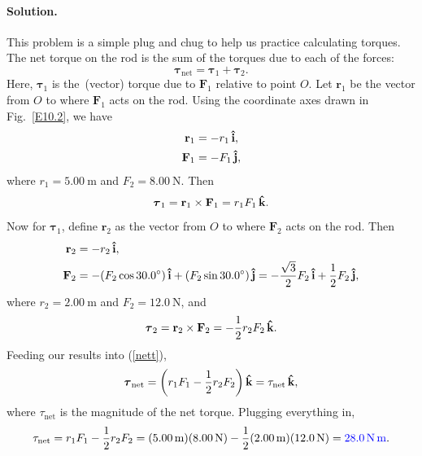 \documentclass[11pt]{article}
\newcommand{\refeq}[1]{(\ref{#1})}
\newcommand{\beq}{\begin{equation*}}
\newcommand{\eeq}{\end{equation*}}
\newcommand{\beqn}{\begin{equation}}
\newcommand{\eeqn}{\end{equation}}
\newenvironment{solution}
{
    \paragraph{Solution.}
    \ignorespaces
}
{
    \bigskip
}
\renewcommand{\vec}[1]{\mathbf{#1}}
\begin{document}
\newcommand{\vF}{\vec{F}}
\newcommand{\vt}{\boldsymbol{\tau}}
\newcommand{\vr}{\vec{r}}

\newcommand{\vFq}{\vF_1}
\newcommand{\Fq}{F_1}
\newcommand{\vFw}{\vF_2}
\newcommand{\Fw}{F_2}

\newcommand{\vtq}{\vt_1}
\newcommand{\vtw}{\vt_2}
\newcommand{\vrq}{\vr_1}
\newcommand{\rrq}{r_1}
\newcommand{\vrw}{\vr_2}
\newcommand{\rw}{r_2}

\newcommand{\vtnet}{\vt_\text{net}}
\newcommand{\tnet}{\tau_\text{net}}


\begin{solution}
	This problem is a simple plug and chug to help us practice calculating torques.  The net torque on the rod is the sum of the torques due to each of the forces:
	\beqn \label{nett}
		\vtnet = \vtq + \vtw.
	\eeqn
	Here, $\vtq$ is the~(vector) torque due to $\vFq$ relative to point $O$.  Let $\vrq$ be the vector from $O$ to where $\vFq$ acts on the rod.  Using the coordinate axes drawn in Fig.~\ref{E10.2}, we have
	\begin{align*}
		\vrq &= -\rrq \ih, \\
		\vFq &= -\Fq \jh,
	\end{align*}
	where $\rrq = \SI{5.00}{\meter}$ and $\Fw = \SI{8.00}{\newton}$.  Then
	\beq
		\vtq = \vrq \times \vFq = \rrq \Fq \kh.
	\eeq
	Now for $\vtq$, define $\vrw$ as the vector from $O$ to where $\vFw$ acts on the rod.  Then
		\begin{align*}
		\vrw &= -\rw \ih, \\
		\vFw &= -(\Fw \cos{30.0^\circ}) \ih + (\Fw \sin{30.0^\circ}) \jh = -\frac{\sqrt{3}}{2} \Fw \ih + \frac{1}{2} \Fw \jh,
	\end{align*}
	where $\rw = \SI{2.00}{\meter}$ and $\Fw = \SI{12.0}{\newton}$, and
	\beq
		\vtw = \vrw \times \vFw = -\frac{1}{2} \rw \Fw \kh.
	\eeq
	Feeding our results into \refeq{nett},
	\beq
		\vtnet = \left( \rrq \Fq - \frac{1}{2} \rw \Fw \right)\!\kh = \tnet \kh,
	\eeq
	where $\tnet$ is the magnitude of the net torque.  Plugging everything in,
	\beq
		\tnet = \rrq \Fq - \frac{1}{2} \rw \Fw = (\SI{5.00}{\meter}) (\SI{8.00}{\newton}) - \frac{1}{2} (\SI{2.00}{\meter}) (\SI{12.0}{\newton}) = {\color{blue} \SI{28.0}{\newton\meter}}.
	\eeq
\end{solution}

\newcommand{\mb}{m_b}
\newcommand{\mw}{m_w}
\newcommand{\mmp}{m_p}

\newcommand{\simb}{\SI{12.0}{\kg} }
\newcommand{\simw}{\SI{5.00}{\kg} }
\newcommand{\simp}{\SI{2.00}{\kg} }
\newcommand{\sIip}{\SI{0.0625}{\kg\square\meter} }
\end{document}

